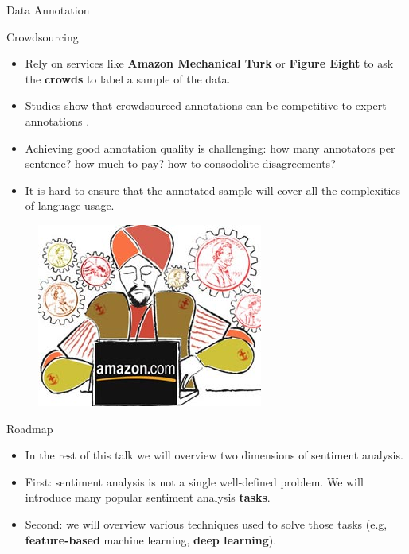 \documentclass[handout]{beamer}
\begin{document}
\begin{frame}{Data Annotation}
\begin{scriptsize}
\begin{block}{Crowdsourcing}
  \begin{itemize}
\item Rely on services like \textbf{Amazon Mechanical Turk} or \textbf{Figure Eight} to ask the \textbf{crowds} to label a sample of the data.


\item Studies show that crowdsourced annotations can be competitive to expert annotations \cite{snow-etal-2008-cheap}.

\item Achieving good annotation quality is challenging: how many annotators per sentence? how much to pay? how to consodolite disagreements? 

\item It is hard to ensure that the annotated sample will cover all the complexities of language usage. 
   \end{itemize} 
 
\end{block}
\end{scriptsize}

     \begin{figure}[h]
        	\includegraphics[scale = 0.3]{pics/amt.jpg}
        \end{figure}

\end{frame}


\begin{frame}{Roadmap}
\begin{scriptsize}
\begin{itemize}
\item In the rest of this talk we will overview two dimensions of sentiment analysis.
\item First: sentiment analysis is not a single well-defined problem. We will introduce many popular sentiment analysis \textbf{tasks}.

\item Second: we will overview various techniques used to solve those tasks (e.g, \textbf{feature-based} machine learning, \textbf{deep learning}).

\end{itemize} 

\end{scriptsize}

\end{frame}
\end{document}
